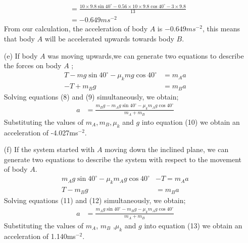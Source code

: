 \documentclass[12pt,a4paper]{article}
\begin{document}
\begin{itemize}
\begin{align*}
&=\frac{10\times9.8\sin40^\circ-0.56\times10\times9.8\cos40^\circ-3\times9.8}{13}\\
&=-0.649ms^{-2}
\end{align*}
From our calculation, the acceleration of body $A$ is $-0.649ms^{-2}$, this means that body $A$ will be accelerated upwards towards body $B$. 
\item[(e)]
If body $A$ was moving upwards,we can generate two equations to describe the forces on body $A$ ;
 \begin{align}
T-mg\sin40^\circ-\mu_{k}mg\cos40^\circ&=m_{A}a\\
-T+m_{B}g&=m_{B}a
\end{align}
Solving equations (8) and (9) simultaneously, we obtain;
\begin{align}
a&=\frac{m_{B}g-m_{A}g\sin40^\circ-\mu_{k}m_{A}g\cos40^\circ}{m_{A}+m_{B}}
\end{align}
Substituting the values of $m_{A}$,\,$m_{B}$,\,$\mu_{k}$ and $g$ into equation (10) we obtain an acceleration of -4.027ms$^{-2}$. 
\item[(f)]
If the system started with $A$ moving down the inclined plane, we can generate two equations to describe the system with respect to the movement of body $A$.
 \begin{align}
m_{A}g\sin40^\circ-\mu_{k}m_{A}g\cos40^\circ&-T=m_{A}a\\
T-m_{B}g&=m_{B}a
\end{align}
Solving equations (11) and (12) simultaneously, we obtain;
\begin{align}
a&=\frac{m_{A}g\sin40^\circ-m_{B}g-\mu_{k}m_{A}g\cos40^\circ}{m_{A}+m_{B}}
\end{align}
Substituting the values of $m_{A}$, $m_{B}$ ,$\mu_{k}$ and $g$ into equation (13) we obtain an acceleration of 1.140ms$^{-2}.$ 
\end{itemize}
\end{document}
